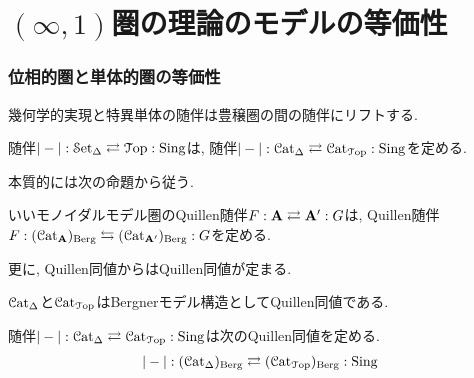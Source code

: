 \documentclass[aspectratio=169, dvipdfmx, 8pt, notheorems, uplatex]{beamer}
\begin{document}
\section{$(\infty,1)$圏の理論のモデルの等価性}

\begin{frame}
  \frametitle{位相的圏と単体的圏の等価性}

  幾何学的実現と特異単体の随伴は豊穣圏の間の随伴にリフトする. 

  \begin{remark}
    随伴$|-| : \mathcal{S}\mathrm{et}_{\Delta} \rightleftarrows \mathcal{T}\mathrm{op} : \mathrm{Sing}$は, 随伴$|-| : \mathcal{C}\mathrm{at}_\Delta \rightleftarrows \mathcal{C}\mathrm{at}_{\mathcal{T}\mathrm{op}} : \mathrm{Sing}$を定める. 
  \end{remark}

  本質的には次の命題から従う. 

  \begin{theorem}
    いいモノイダルモデル圏のQuillen随伴$F: \mathbf{A} \rightleftarrows \mathbf{A}' : G$は, Quillen随伴$F: (\mathcal{C}\mathrm{at}_{\mathbf{A}})_{\mathrm{Berg}} \leftrightarrows (\mathcal{C}\mathrm{at}_{\mathbf{A}'})_{\mathrm{Berg}} : G$を定める. 
    
    更に, Quillen同値からはQuillen同値が定まる. 
  \end{theorem}

  $\mathcal{C}\mathrm{at}_\Delta$と$\mathcal{C}\mathrm{at}_{\mathcal{T}\mathrm{op}}$はBergnerモデル構造としてQuillen同値である. 

  \begin{theorem}
    随伴$|-| : \mathcal{C}\mathrm{at}_\Delta \rightleftarrows \mathcal{C}\mathrm{at}_{\mathcal{T}\mathrm{op}} : \mathrm{Sing}$は次のQuillen同値を定める. 
    \begin{align*}
      |-| : (\mathcal{C}\mathrm{at}_\Delta)_{\mathrm{Berg}} \rightleftarrows (\mathcal{C}\mathrm{at}_{\mathcal{T}\mathrm{op}})_{\mathrm{Berg}} : \mathrm{Sing}
    \end{align*}
  \end{theorem}

\end{frame}
\end{document}

